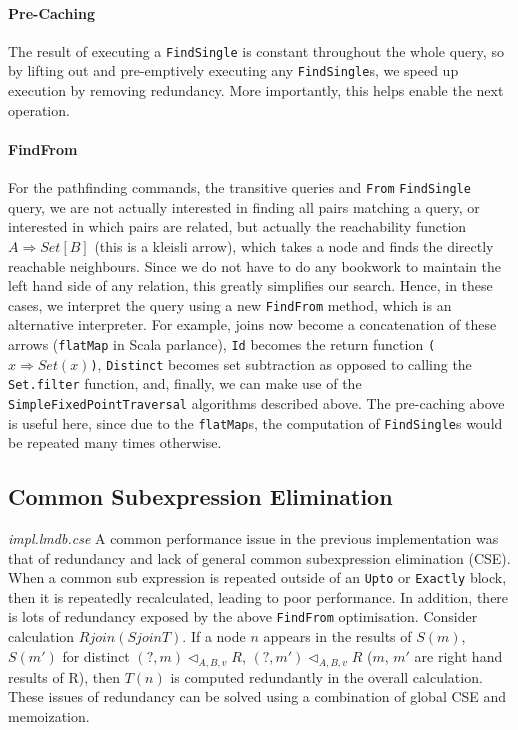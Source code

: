 \documentclass[12pt,a4paper,twoside,openright]{report}
\newcommand\codeName[1]{\texttt{#1}}
\newcommand\note[1]{\textit{#1}}
\newcommand{\opRule}[3]{#1 \triangleleft_{#2, v} #3}
\begin{document}
		\paragraph{Pre-Caching}
		The result of executing a \codeName{FindSingle} is constant throughout the whole query, so by lifting out and pre-emptively executing any \codeName{FindSingle}s, we speed up execution by removing redundancy. More importantly, this helps enable the next operation.
		
		\paragraph{FindFrom}
		For the pathfinding commands, the transitive queries and \codeName{From} \codeName{FindSingle} query, we are not actually interested in finding all pairs matching a query, or interested in which pairs are related, but actually the reachability function \codeName{$A \Rightarrow Set[B]$} (this is a kleisli arrow), which takes a node and finds the directly reachable neighbours. Since we do not have to do any bookwork to maintain the left hand side of any relation, this greatly simplifies our search. Hence, in these cases, we interpret the query using a new \codeName{FindFrom} method, which is an alternative interpreter. For example, joins now become a concatenation of these arrows (\codeName{flatMap}  in Scala parlance), \codeName{Id} becomes the return function \codeName{($x \Rightarrow Set(x)$)}, \codeName{Distinct} becomes set subtraction as opposed to calling the \codeName{Set.filter} function, and, finally, we can make use of the \codeName{SimpleFixedPointTraversal} algorithms described above. The pre-caching above is useful here, since due to the \codeName{flatMap}s, the computation of \codeName{FindSingle}s would be repeated many times otherwise.

	\subsection{Common Subexpression Elimination}
	\note{impl.lmdb.cse}
	A common performance issue in the previous implementation was that of redundancy and lack of general common subexpression elimination (CSE). When a common sub expression is repeated outside of an \codeName{Upto} or \codeName{Exactly} block, then it is repeatedly recalculated, leading to poor performance. In addition, there is lots of redundancy exposed by the above \codeName{FindFrom} optimisation. Consider calculation $R join (S join T)$. If a node $n$ appears in the results of $S(m)$, $S(m')$ for distinct $\opRule{(?, m)}{A, B}{R}$, $\opRule{(?, m')}{A, B}{R}$ ($m$, $m'$ are right hand results of R), then $T(n)$ is computed redundantly in the overall calculation. These issues of redundancy can be solved using a combination of global CSE and memoization.
\end{document}
